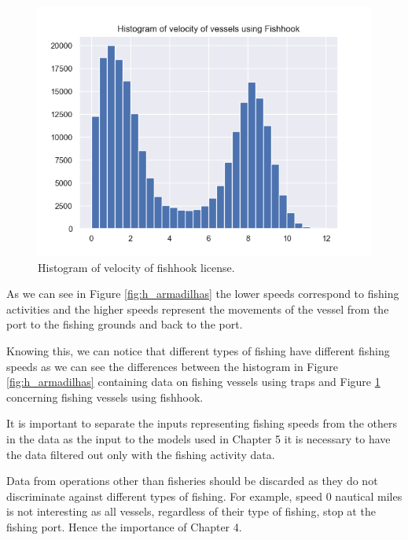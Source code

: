 \begin{figure}[h]
    \centering
    \includegraphics[width=0.8\linewidth]{Chapters/img/h_linha.png}
    \caption{Histogram of velocity of fishhook license.}
    \label{fig:h_linha}
\end{figure}

As we can see in Figure \ref{fig:h_armadilhas} the lower speeds correspond to fishing activities and the higher speeds represent the movements of the vessel from the port to the fishing grounds and back to the port.





Knowing this, we can notice that different types of fishing have different fishing speeds as we can see the differences between the histogram in Figure \ref{fig:h_armadilhas} containing data on fishing vessels using traps and Figure \ref{fig:h_linha} concerning fishing vessels using fishhook.





It is important to separate the inputs representing fishing speeds from the others in the data as the input to the models used in Chapter 5 it is necessary to have the data filtered out only with the fishing activity data.

Data from operations other than fisheries should be discarded as they do not discriminate against different types of fishing. For example, speed 0 nautical miles is not interesting as all vessels, regardless of their type of fishing, stop at the fishing port.
Hence the importance of Chapter 4.






